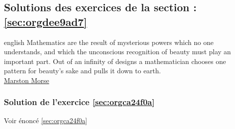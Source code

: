 \documentclass[a4paper, 11pt, twoside]{article}
\begin{document}
\subsection{Solutions des exercices de la section : \ref{sec:orgdee9ad7}}
\label{sec:org48cd3fe}

\begin{foreigndisplayquote}{english}
Mathematics are the result of mysterious powers which no one
understands, and which the unconscious recognition of beauty must
play an important part. Out of an infinity of designs a
mathematician chooses one pattern for beauty’s sake and pulls it
down to earth.\\

\href{https://en.wikipedia.org/wiki/Marston\_Morse}{Marston Morse}
\end{foreigndisplayquote}

\startcontents[level-2]

\subsubsection{Solution de l'exercice \ref{sec:orgca24f0a}}
\label{sec:org1029e6a}
Voir énoncé \ref{sec:orgca24f0a}
\end{document}
